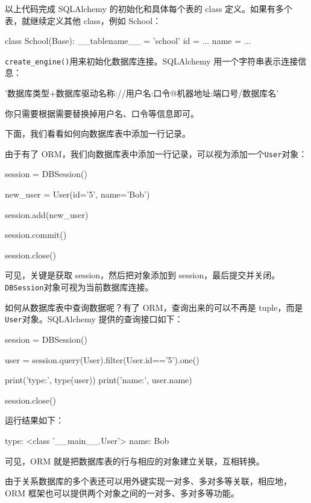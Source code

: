 以上代码完成 SQLAlchemy 的初始化和具体每个表的 class
定义。如果有多个表，就继续定义其他 class，例如 School：

\begin{pythoncode}
class School(Base):
    __tablename__ = 'school'
    id = ...
    name = ...
\end{pythoncode}

\texttt{create\_engine()}用来初始化数据库连接。SQLAlchemy
用一个字符串表示连接信息：

\begin{pythoncode}
'数据库类型+数据库驱动名称://用户名:口令@机器地址:端口号/数据库名'
\end{pythoncode}

你只需要根据需要替换掉用户名、口令等信息即可。

下面，我们看看如何向数据库表中添加一行记录。

由于有了
ORM，我们向数据库表中添加一行记录，可以视为添加一个\texttt{User}对象：

\begin{pythoncode}
session = DBSession()

new_user = User(id='5', name='Bob')

session.add(new_user)

session.commit()

session.close()
\end{pythoncode}

可见，关键是获取 session，然后把对象添加到
session，最后提交并关闭。\texttt{DBSession}对象可视为当前数据库连接。

如何从数据库表中查询数据呢？有了 ORM，查询出来的可以不再是
tuple，而是\texttt{User}对象。SQLAlchemy 提供的查询接口如下：

\begin{pythoncode}
session = DBSession()

user = session.query(User).filter(User.id=='5').one()

print('type:', type(user))
print('name:', user.name)

session.close()
\end{pythoncode}

运行结果如下：

\begin{pythoncode}
type: <class '__main__.User'>
name: Bob
\end{pythoncode}

可见，ORM 就是把数据库表的行与相应的对象建立关联，互相转换。

由于关系数据库的多个表还可以用外键实现一对多、多对多等关联，相应地，ORM
框架也可以提供两个对象之间的一对多、多对多等功能。

